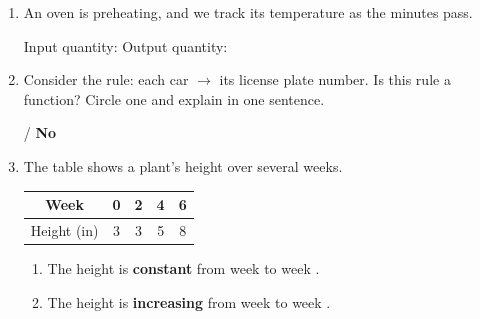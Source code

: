 \documentclass[10pt]{article}
\begin{document}

\vspace{0.12in}

\begin{enumerate}[itemsep=12pt]

\item An oven is preheating, and we track its temperature as the minutes pass.

\vspace{0.06in}
Input quantity:  \quad Output quantity: 

\item Consider the rule: each car $\to$ its license plate number.
Is this rule a function? Circle one and explain in one sentence.

\vspace{0.06in}
 \quad / \quad \textbf{No}

\vspace{0.02in}

\item The table shows a plant's height over several weeks.

\smallskip
\begin{tabular}{|c|c|c|c|c|}
\hline
Week & 0 & 2 & 4 & 6 \\
\hline
Height (in) & 3 & 3 & 5 & 8 \\
\hline
\end{tabular}
\smallskip

\begin{enumerate}[label=(\alph*), itemsep=4pt]
  \item The height is \textbf{constant} from week  to week .
  \item The height is \textbf{increasing} from week  to week .
\end{enumerate}

\end{enumerate}
\end{document}
